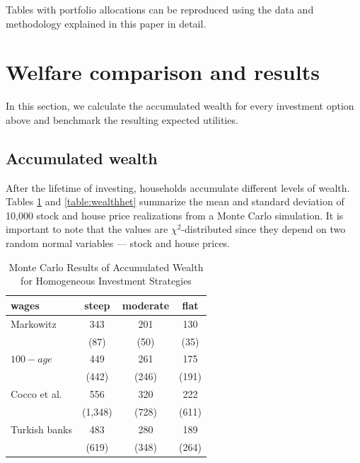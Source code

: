 \documentclass[]{elsarticle}
\begin{document}
Tables with portfolio allocations can be reproduced using the data and methodology explained in this paper in detail.

\section{Welfare comparison and results}
\label{welfare}

In this section, we calculate the accumulated wealth for every investment option above and benchmark the resulting expected utilities.

\subsection{Accumulated wealth}

After the lifetime of investing, households accumulate different levels of wealth. Tables \ref{table:wealthhom} and \ref{table:wealthhet} summarize the mean and standard deviation of 10,000 stock and house price realizations from a Monte Carlo simulation. It is important to note that the values are $\chi^2$-distributed since they depend on two random normal variables --- stock and house prices.

\begin{table}[h!]
	\centering
	\caption{Monte Carlo Results of Accumulated Wealth for Homogeneous Investment Strategies}
	\label{table:wealthhom}
	\begin{tabular}[c]{|l|c|c|c|}
		\hline
		 wages& steep & moderate & flat\\
		\hline
Markowitz			&  343  &   201&   130\\
							& (87)  &  (50)&   (35)\\
$100-age$					&  449  &   261&  175\\  
							& (442) & (246)& (191)\\
Cocco et al.				&  556  &   320&  222\\  
							&(1,348)& (728)& (611)\\
Turkish banks			 	&  483  &   280&  189\\  
							&  (619)& (348)& (264)\\
	\hline
	\end{tabular}
\end{table}
\end{document}
